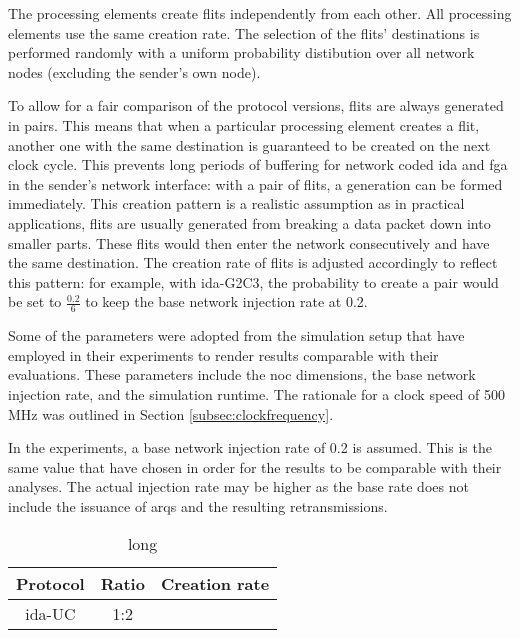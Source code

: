 The processing elements create flits independently from each other. All processing elements use the same creation rate. The selection of the flits'
destinations is performed randomly with a uniform probability distibution over all network nodes (excluding the sender's own node).

To allow for a fair comparison of the protocol versions, flits are always generated in pairs. This means that when a particular processing
element creates a flit, another one with the same destination is guaranteed to be created on the next clock cycle. This prevents long periods of
buffering for network coded \gls{ida} and \gls{fga} in the sender's network interface: with a pair of flits, a generation can be formed immediately. This creation
pattern is a realistic assumption as in practical applications, flits are usually generated from breaking a data packet down into smaller parts. These
flits would then enter the network consecutively and have the same destination. The creation rate of flits is adjusted accordingly to reflect this
pattern: for example, with \gls{ida}-G2C3, the probability to create a pair would be set to $\frac{0.2}{6}$ to keep the base network injection rate at
0.2.

Some of the parameters were adopted from the simulation setup that \citeauthor{moriam18activeattackers} \cite{moriam18activeattackers} have employed
in their experiments to render results comparable with their evaluations. These parameters include the \gls{noc} dimensions, the base network
injection rate, and the simulation runtime. The rationale for a clock speed of 500 MHz was outlined in Section \ref{subsec:clockfrequency}.

In the experiments, a base network injection rate of 0.2 is assumed. This is the same value that \citeauthor{moriam18activeattackers} have chosen
\cite[2]{moriam18activeattackers} in order for the results to be comparable with their analyses. The actual injection rate may be higher as the base rate does not include the
issuance of \glspl{arq} and the resulting retransmissions.

\begin{table}
    \centering
    \begin{tabulary}{\textwidth}{C|C|C}
        Protocol & Ratio & Creation rate \\\hline
        \gls{ida}-UC & 1:2 & \\
    \end{tabulary}
    \caption[short]{long}
    \label{tab:creationrates}
\end{table}

